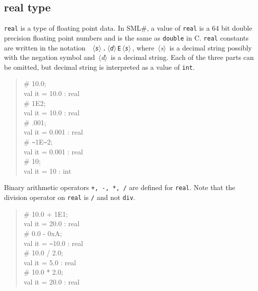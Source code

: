 \documentclass{jbook}
\newcommand{\smlsharp}{SML\#}
\newcommand{\code}[1]{\mbox{\large\tt #1}}
\newcommand{\nonterm}[1]{\mbox{$\,\langle$}{\it #1}\mbox{$\rangle\,$}}
\newenvironment{program}{\begin{quote}\begin{tt}}%
                        {\end{tt}\end{quote}}
\begin{document}
\subsection{real type}
	{\tt real} is a type of floating point data.
	In \smlsharp{}, a value of {\tt real} is a 64 bit double
precision floating point numbers and is the same as \code{double} in C.
	{\tt real} constants are written in the notation {\tt
\nonterm{s}.\nonterm{d}E\nonterm{s}}, where \nonterm{s} is a decimal
string possibly with the negation symbol and \nonterm{d} is a decimal
string.
	Each of the three parts can be omitted, but decimal string is
interpreted as a value of  {\tt int}.
\begin{program}
\# 10.0;\\
val it = 10.0 : real\\
\# 1E2;\\
val it = 10.0 : real\\
\# .001;\\
val it = 0.001 : real\\
\# \verb|~|1E\verb|~|2;\\
val it = 0.001 : real\\
\# 10;\\
val it = 10 : int
\end{program}
	Binary arithmetic operators {\tt +, -, *, /} are defined for {\tt real}.
	Note that the division operator on {\tt real} is {\tt /} and not
{\tt div}.
\begin{program}
\# 10.0 + 1E1;\\
val it = 20.0 : real\\
\# 0.0 - 0xA;\\
val it = \verb|~|10.0 : real\\
\# 10.0 / 2.0;\\
val it = 5.0 : real\\
\# 10.0 * 2.0;\\
val it = 20.0 : real
\end{program}
\end{document}
